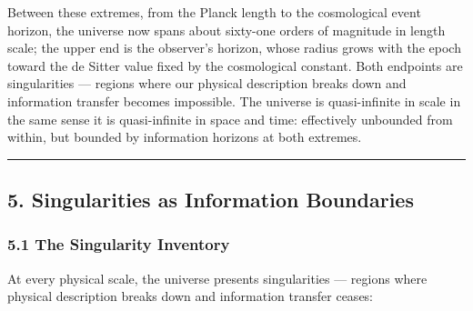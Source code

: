\documentclass[
]{article}
\begin{document}
Between these extremes, from the Planck length to the cosmological event
horizon, the universe now spans about sixty-one orders of magnitude in
length scale; the upper end is the observer's horizon, whose radius
grows with the epoch toward the de Sitter value fixed by the
cosmological constant. Both endpoints are singularities --- regions
where our physical description breaks down and information transfer
becomes impossible. The universe is quasi-infinite in scale in the same
sense it is quasi-infinite in space and time: effectively unbounded from
within, but bounded by information horizons at both extremes.

\begin{center}\rule{0.5\linewidth}{0.5pt}\end{center}

\hypertarget{singularities-as-information-boundaries}{%
\subsection{5. Singularities as Information
Boundaries}\label{singularities-as-information-boundaries}}

\hypertarget{the-singularity-inventory}{%
\subsubsection{5.1 The Singularity
Inventory}\label{the-singularity-inventory}}

At every physical scale, the universe presents singularities --- regions
where physical description breaks down and information transfer ceases:
\end{document}
